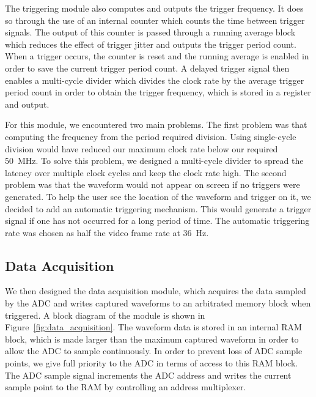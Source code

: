 \documentclass[journal]{IEEEtran}
\begin{document}
The triggering module also computes and outputs the trigger frequency. It does so through the use of an internal counter which counts the time between trigger signals. The output of this counter is passed through a running average block which reduces the effect of trigger jitter and outputs the trigger period count. When a trigger occurs, the counter is reset and the running average is enabled in order to save the current trigger period count. A delayed trigger signal then enables a multi-cycle divider which divides the clock rate by the average trigger period count in order to obtain the trigger frequency, which is stored in a register and output.

For this module, we encountered two main problems. The first problem was that computing the frequency from the period required division. Using single-cycle division would have reduced our maximum clock rate below our required 50~MHz. To solve this problem, we designed a multi-cycle divider to spread the latency over multiple clock cycles and keep the clock rate high. The second problem was that the waveform would not appear on screen if no triggers were generated. To help the user see the location of the waveform and trigger on it, we decided to add an automatic triggering mechanism. This would generate a trigger signal if one has not occurred for a long period of time. The automatic triggering rate was chosen as half the video frame rate at 36~Hz.

\subsection{Data Acquisition}

We then designed the data acquisition module, which acquires the data sampled by the ADC and writes captured waveforms to an arbitrated memory block when triggered. A block diagram of the module is shown in Figure~\ref{fig:data_acquisition}. The waveform data is stored in an internal RAM block, which is made larger than the maximum captured waveform in order to allow the ADC to sample continuously. In order to prevent loss of ADC sample points, we give full priority to the ADC in terms of access to this RAM block. The ADC sample signal increments the ADC address and writes the current sample point to the RAM by controlling an address multiplexer.
\end{document}
